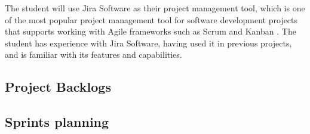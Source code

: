 The student will use Jira Software as their project management tool, which is one of the most popular project management tool for software development projects that supports working with Agile frameworks such as Scrum and Kanban \parencite{atlassian}. The student has experience with Jira Software, having used it in previous projects, and is familiar with its features and capabilities.

\subsection{Project Backlogs}

\subsection{Sprints planning}